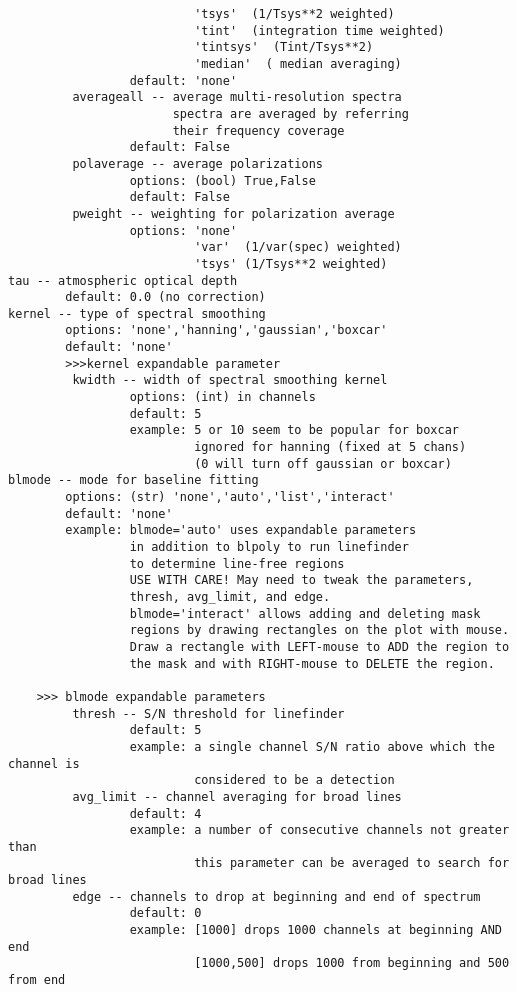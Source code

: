 \begin{verbatim}
                          'tsys'  (1/Tsys**2 weighted)
                          'tint'  (integration time weighted)
                          'tintsys'  (Tint/Tsys**2)
                          'median'  ( median averaging)
                 default: 'none'
         averageall -- average multi-resolution spectra
                       spectra are averaged by referring 
                       their frequency coverage
                 default: False
         polaverage -- average polarizations
                 options: (bool) True,False
                 default: False
         pweight -- weighting for polarization average
                 options: 'none'
                          'var'  (1/var(spec) weighted)
                          'tsys' (1/Tsys**2 weighted)
tau -- atmospheric optical depth
        default: 0.0 (no correction)
kernel -- type of spectral smoothing
        options: 'none','hanning','gaussian','boxcar'
        default: 'none'
        >>>kernel expandable parameter
         kwidth -- width of spectral smoothing kernel
                 options: (int) in channels
                 default: 5
                 example: 5 or 10 seem to be popular for boxcar
                          ignored for hanning (fixed at 5 chans)
                          (0 will turn off gaussian or boxcar)
blmode -- mode for baseline fitting
        options: (str) 'none','auto','list','interact'
        default: 'none'
        example: blmode='auto' uses expandable parameters
                 in addition to blpoly to run linefinder
                 to determine line-free regions
                 USE WITH CARE! May need to tweak the parameters,
                 thresh, avg_limit, and edge.
                 blmode='interact' allows adding and deleting mask 
                 regions by drawing rectangles on the plot with mouse. 
                 Draw a rectangle with LEFT-mouse to ADD the region to 
                 the mask and with RIGHT-mouse to DELETE the region. 

    >>> blmode expandable parameters
         thresh -- S/N threshold for linefinder
                 default: 5
                 example: a single channel S/N ratio above which the channel is
                          considered to be a detection
         avg_limit -- channel averaging for broad lines
                 default: 4
                 example: a number of consecutive channels not greater than
                          this parameter can be averaged to search for broad lines
         edge -- channels to drop at beginning and end of spectrum
                 default: 0
                 example: [1000] drops 1000 channels at beginning AND end
                          [1000,500] drops 1000 from beginning and 500 from end


\end{verbatim}

